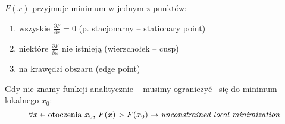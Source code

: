   \begin{frame}
    \begin{block}{$ F(x) $ przyjmuje minimum w jednym z punktów:}
      \begin{enumerate}
        \item wszyskie $ \frac{\partial F}{\partial x} = 0 $
        (p. stacjonarny -- stationary point)
        \item niektóre $ \frac{\partial F}{\partial x} $
        nie istnieją (wierzchołek -- cusp)
        \item na krawędzi obszaru (edge point)
      \end{enumerate}
    \end{block}

    Gdy nie znamy funkcji analitycznie -- musimy ograniczyć~
    się do minimum lokalnego $ x_0 $:
    \begin{displaymath}
      \forall x \in \text{otoczenia}\ x_0{,}\ F(x) > F(x_0)
      \to \text{\emph{unconstrained local minimization}}
    \end{displaymath}

  \end{frame}
